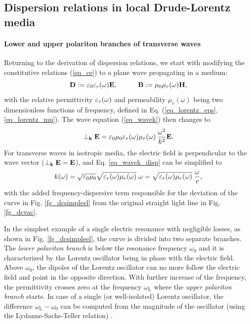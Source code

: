\subsection{Dispersion relations in local Drude-Lorentz media} \label{disp_rel_local_media}
\paragraph{Lower and upper polariton branches of transverse waves} %
Returning to the derivation of dispersion relations, we start with modifying the constitutive relations (\ref{eq_ce}) to a plane wave propagating in a medium:
\begin{equation}		\mathbf{D} := \varepsilon_0\varepsilon_r(\omega)	\mathbf{E}, \quad\quad\quad						\mathbf{B} := \mu_0\mu_r(\omega)		\mathbf{H},				 \label{eq_ce2}\end{equation}
with the relative permittivity $\varepsilon_r(\omega)$ and permeability $\mu_r(\omega)$ being two dimensionless functions of frequency, defined in Eq. (\ref{eq_lorentz_eps}, \ref{eq_lorentz_mu}). 
The wave equation (\ref{eq_wavek}) then changes to
\begin{equation}  \perp_{\mathbf{k}}\mathbf{E} = \varepsilon_0 \mu_0  \varepsilon_r(\omega) \mu_r(\omega) \, \frac{ \omega^{2}}{k^2} \mathbf{E}.  \label{eq_wavek_disp}\end{equation}
For transverse waves in isotropic media, the electric field is perpendicular to the wave vector ($\perp_{\mathbf{k}}\mathbf{E} = \mathbf{E}$), and Eq. \ref{eq_wavek_disp} can be simplified to  
\begin{equation} k(\omega) = \sqrt{\varepsilon_0 \mu_0} \sqrt{\varepsilon_r(\omega) \mu_{r}(\omega)}\;\omega = \sqrt{\varepsilon_r(\omega) \mu_{r}(\omega)}\; \frac{\omega}{c}, \label{eq_dispeq_loc}\end{equation}
with the added frequency-dispersive term responsible for the deviation of the curve in Fig. \ref{fg_dcsimpleel} from the original straight light line in Fig. \ref{fg_dcvac}. 

In the simplest example of a single electric resonance with negligible losses, as shown in Fig. \ref{fg_dcsimpleel}, the curve is divided into two separate branches. The \textit{lower polariton branch} is below the resonance frequency $\omega_0$ and it is characterized by the Lorentz oscillator being in phase with the electric field. Above $\omega_0$, the dipoles of the Lorentz oscillator can no more follow the electric field and point in the opposite direction. With further increase of the frequency, the permittivity crosses zero at the frequency $\omega_{\text{L}}$ where the \textit{upper polariton branch} starts. In case of a single (or well-isolated) Lorentz oscillator, the difference $\omega_{\text{L}} - \omega_0$ can be computed from the magnitude of the oscillator (using the Lydanne-Sachs-Teller relation) \cite{klingshirn2007semiconductor}.

